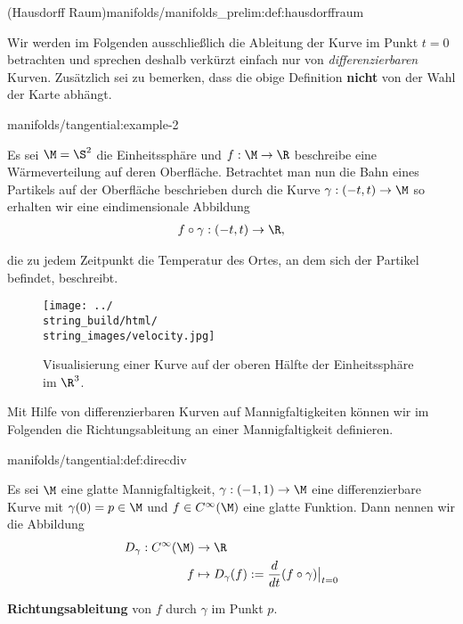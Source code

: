 \documentclass[letterpaper,10pt,english]{jupyterBook}
\begin{document}
\begin{definition}{(Hausdorff Raum)}{manifolds/manifolds_prelim:def:hausdorffraum}
\par
Wir werden im Folgenden ausschließlich die Ableitung der Kurve im Punkt \(t=0\) betrachten und sprechen deshalb verkürzt einfach nur von \emph{differenzierbaren} Kurven.
Zusätzlich sei zu bemerken, dass die obige Definition \textbf{nicht} von der Wahl der Karte abhängt.
\begin{example}{}{manifolds/tangential:example-2}



\par
Es sei \(\M=\S^2\) die Einheitssphäre und \(f:\M\to\R\) beschreibe eine Wärmeverteilung auf deren Oberfläche.
Betrachtet man nun die Bahn eines Partikels auf der Oberfläche beschrieben durch die Kurve \(\gamma:(-t, t)\to \M\) so erhalten wir eine eindimensionale Abbildung
\begin{align*}
f\circ\gamma:(-t,t)\to \R,
\end{align*}
\par
die zu jedem Zeitpunkt die Temperatur des Ortes, an dem sich der Partikel befindet, beschreibt.
\end{example}

\begin{figure}[htbp]
\centering


\noindent\texttt{[image: ../\\string\_build/html/\\string\_images/velocity.jpg]}
\caption{Visualisierung einer Kurve auf der oberen Hälfte der Einheitssphäre im \(\R^3\).}\label{\detokenize{manifolds/tangential:fig-velocity}}\end{figure}

\par
Mit Hilfe von differenzierbaren Kurven auf Mannigfaltigkeiten können wir im Folgenden die Richtungsableitung an einer Mannigfaltigkeit definieren.
\begin{definition}{}{manifolds/tangential:def:direcdiv}



\par
Es sei \(\M\) eine glatte Mannigfaltigkeit, \(\gamma:(-1,1)\to\M\) eine differenzierbare Kurve mit \(\gamma(0)=p\in\M\) und \(f \in C^\infty(\M)\) eine glatte Funktion.
Dann nennen wir die Abbildung
\begin{align*}
D_\gamma : C^\infty(\M) &\to \R\\
f &\mapsto D_\gamma(f):=\frac{d}{dt}(f\circ \gamma)\big\rvert_{t=0}
\end{align*}
\par
\textbf{Richtungsableitung} von \(f\) durch \(\gamma\) im Punkt \(p\).
\end{definition}


\end{definition}
\end{document}
